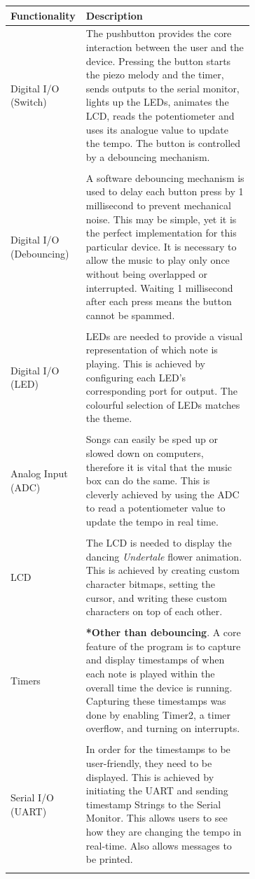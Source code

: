 \documentclass[a4paper]{article}
\begin{document}
\begin{center}
\begin{tabular}{ l | p{0.69\linewidth} }
\textbf{Functionality} & \textbf{Description}\\
 \hline
 Digital I/O (Switch) & The pushbutton provides the core interaction between the user and the device. Pressing the button starts the piezo melody and the timer, sends outputs to the serial monitor, lights up the LEDs, animates the LCD, reads the potentiometer and uses its analogue value to update the tempo. The button is controlled by a debouncing mechanism. \\\\
 Digital I/O (Debouncing) & A software debouncing mechanism is used to delay each button press by 1 millisecond to prevent mechanical noise. This may be simple, yet it is the perfect implementation for this particular device. It is necessary to allow the music to play only once without being overlapped or interrupted. Waiting 1 millisecond after each press means the button cannot be spammed.\\\\
 Digital I/O (LED) & LEDs are needed to provide a visual representation of which note is playing. This is achieved by configuring each LED’s corresponding port for output. The colourful selection of LEDs matches the theme.\\\\
 Analog Input (ADC) & Songs can easily be sped up or slowed down on computers, therefore it is vital that the music box can do the same. This is cleverly achieved by using the ADC to read a potentiometer value to update the tempo in real time.\\\\ 
 LCD & The LCD is needed to display the dancing \emph{Undertale} flower animation. This is achieved by creating custom character bitmaps, setting the cursor, and writing these custom characters on top of each other.\\\\
 Timers & \textbf{*Other than debouncing}. A core feature of the program is to capture and display timestamps of when each note is played within the overall time the device is running. Capturing these timestamps was done by enabling Timer2, a timer overflow, and turning on interrupts.\\\\
 Serial I/O (UART) & In order for the timestamps to be user-friendly, they need to be displayed. This is achieved by initiating the UART and sending timestamp Strings to the Serial Monitor. This allows users to see how they are changing the tempo in real-time. Also allows messages to be printed.\\\\

\end{tabular}
\end{center}
\end{document}
